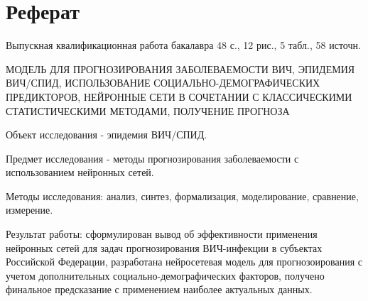 \chapter*{Реферат}
\label{ch:referat}
\linespread{1.5}

Выпускная квалификационная работа бакалавра 48 с., 12 рис., 5 табл., 58 источн.

\noindent

 МОДЕЛЬ ДЛЯ ПРОГНОЗИРОВАНИЯ ЗАБОЛЕВАЕМОСТИ ВИЧ, ЭПИДЕМИЯ ВИЧ/СПИД, ИСПОЛЬЗОВАНИЕ СОЦИАЛЬНО-ДЕМОГРАФИЧЕСКИХ ПРЕДИКТОРОВ, НЕЙРОННЫЕ СЕТИ В СОЧЕТАНИИ С КЛАССИЧЕСКИМИ СТАТИСТИЧЕСКИМИ МЕТОДАМИ, ПОЛУЧЕНИЕ ПРОГНОЗА

Объект исследования - эпидемия ВИЧ/СПИД.

Предмет исследования - методы прогнозирования заболеваемости с использованием нейронных сетей.

Методы исследования: анализ, синтез, формализация, моделирование, сравнение, измерение.

Результат работы: сформулирован вывод об эффективности применения нейронных сетей для задач прогнозирования ВИЧ-инфекции в субъектах Российской Федерации, разработана нейросетевая модель для прогнозоирования с учетом дополнительных социально-демографических факторов, получено финальное предсказание с применением наиболее актуальных данных.


\endinput